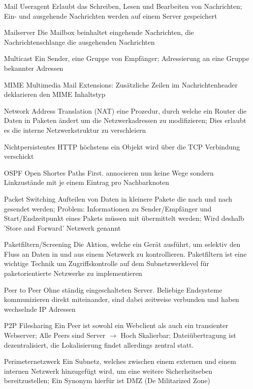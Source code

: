 \documentclass[10pt,landscape]{article}
\begin{document}
\begin{multicols}{3}
\begin{description*}
        \item[Mail Useragent] Erlaubt das Schreiben, Lesen und Bearbeiten von Nachrichten; Ein- und ausgehende Nachrichten werden auf einem Server gespeichert
        \item[Mailserver] Die Mailbox beinhaltet eingehende Nachrichten, die Nachrichtenschlange die ausgehenden Nachrichten
        \item[Multicast] Ein Sender, eine Gruppe von Empfänger; Adressierung an eine Gruppe bekannter Adressen
        \item[MIME] Multimedia Mail Extensions: Zusätzliche Zeilen im Nachrichtenheader deklarieren den MIME Inhaltstyp
        \item[Network Address Translation (NAT)] eine Prozedur, durch welche ein Router die Daten in Paketen ändert um die Netzwerkadressen zu modifizieren; Dies erlaubt es die interne Netzwerkstruktur zu verschleiern
        \item[Nichtpersistentes HTTP] höchstens ein Objekt wird über die TCP Verbindung verschickt
        \item[OSPF] Open Shortes Paths First. annocieren nun keine Wege sondern Linkzustände mit je einem Eintrag pro Nachbarknoten
        \item[Packet Switching] Aufteilen von Daten in kleinere Pakete die nach und nach gesendet werden; Problem: Informationen zu Sender/Empfänger und Start/Endzeitpunkt eines Pakets müssen mit übermittelt werden; Wird deshalb 'Store and Forward' Netzwerk genannt
        \item[Paketfiltern/Screening] Die Aktion, welche ein Gerät ausführt, um selektiv den Fluss an Daten in und aus einem Netzwerk zu kontrollieren. Paketfiltern ist eine wichtige Technik um Zugriffskontrolle auf dem Subnetzwerklevel für paketorientierte Netzwerke zu implementieren
        \item[Peer to Peer] Ohne ständig eingeschalteten Server. Beliebige Endsysteme kommunizieren direkt miteinander, sind dabei zeitweise verbunden und haben wechselnde IP Adressen
        \item[P2P Filesharing] Ein Peer ist sowohl ein Webclient als auch ein transienter Webserver; Alle Peers sind Server $\rightarrow$ Hoch Skalierbar; Dateiübertragung ist dezentralisiert, die Lokalisierung findet allerdings zentral statt.
        \item[Perimeternetzwerk] Ein Subnetz, welches zwischen einem externen und einem internen Netzwerk hinzugefügt wird, um eine weitere Sicherheitseben bereitzustellen; Ein Synonym hierfür ist DMZ (De Militarized Zone)

\end{description*}
\end{multicols}
\end{document}

